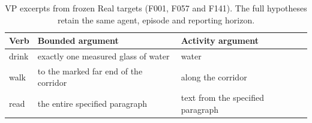 \begin{table}[t]
\centering
\caption{VP excerpts from frozen Real targets (F001, F057 and F141). The full hypotheses retain the same agent, episode and reporting horizon.}
\label{tab:vp_examples}
\setlength{\tabcolsep}{3pt}
\begin{tabular}{@{}l>{\raggedright\arraybackslash}p{}>{\raggedright\arraybackslash}p{}@{}}
\toprule
Verb & Bounded argument & Activity argument\\
\midrule
drink & exactly one measured glass of water & water\\
walk & to the marked far end of the corridor & along the corridor\\
read & the entire specified paragraph & text from the specified paragraph\\
\bottomrule
\end{tabular}
\end{table}
